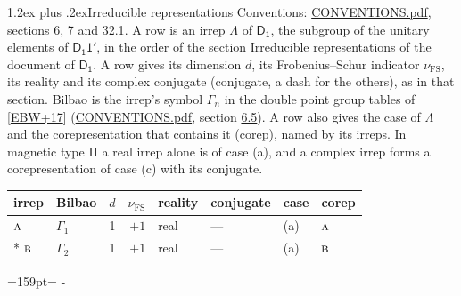 \documentclass[10pt,a4paper]{article}
\makeatletter
\renewcommand\section{\@startsection{section}{1}{\z@}{-3ex plus -1ex minus -.2ex}%
  {1.2ex plus .2ex}{\normalfont\large\sffamily\bfseries\color{parttitle}}}
\newcommand{\needspace}[1]{\par\penalty-100\begingroup\dimen0=#1\relax\dimen2=\pagegoal
  \advance\dimen2-\pagetotal\ifdim\dimen0>\dimen2\relax\ifdim\dimen2>0pt\vfil\break\fi\fi
  \endgroup}
\numberwithin{equation}{section}
\newcommand{\grp}[1]{\mathsf{#1}}
\newcommand{\irr}[1]{\text{\normalfont\scshape #1}}
\newcommand{\fsind}{\nu_{\mathrm{FS}}}
\makeatother
\begin{document}
\section{Irreducible representations}\label{s:irreps}
Conventions: \href{../../CONVENTIONS.pdf}{CONVENTIONS.pdf}, sections \href{../../../rotation/CONVENTIONS.pdf\#conv.6}{6}, \href{../../../rotation/CONVENTIONS.pdf\#conv.7}{7} and \href{../../CONVENTIONS.pdf\#conv.32.1}{32.1}.
\leavevmode\label{n:irrep.Delta}A row is an irrep $\Lambda$ of $\grp{D_{1}}$, the subgroup of the unitary elements of $\grp{D_{1}1'}$, in the order of the section Irreducible representations of the document of \href{../../../rotation/data/pdf/D1.pdf}{$\grp{D_{1}}$}. \label{n:index.dimension}\label{n:index.frobenius}\label{n:head.irrep}\label{n:head.reality}\label{n:head.conjugate}A row gives its dimension $d$, its Frobenius--Schur indicator $\fsind$, its reality and its complex conjugate (conjugate, a dash for the others), as in that section. \label{n:head.bilbao}\label{n:irrep.alias.gamma}Bilbao is the irrep's symbol $\Gamma_n$ in the double point group tables of [\href{../../../REFERENCES.pdf\#ref.EBW+17}{EBW+17}] (\href{../../CONVENTIONS.pdf}{CONVENTIONS.pdf}, section \href{../../../rotation/CONVENTIONS.pdf\#conv.6.5}{6.5}). \label{n:head.case.corep}\label{n:head.corep}A row also gives the case of $\Lambda$ and the corepresentation that contains it (corep), named by its irreps. In magnetic type II a real irrep alone is of case (a), and a complex irrep forms a corepresentation of case (c) with its conjugate.
\setlength{\emergencystretch}{2em}\par\setlength{\emergencystretch}{0pt}
{\small\renewcommand{\arraystretch}{1.25}\setlength{\tabcolsep}{4pt}\begin{longtable}{@{}llrrllll@{}}\toprule
irrep & Bilbao & $d$ & $\fsind$ & reality & conjugate & case & corep\\\midrule\endhead
\bottomrule\endfoot\endlastfoot
$\irr{a}$ & $\Gamma_{1}$ & 1 & $+1$ & real & --- & (a) & $\irr{a}$\\*
$\irr{b}$ & $\Gamma_{2}$ & 1 & $+1$ & real & --- & (a) & $\irr{b}$\\
\bottomrule\end{longtable}}
\needspace{159pt}
\end{document}
